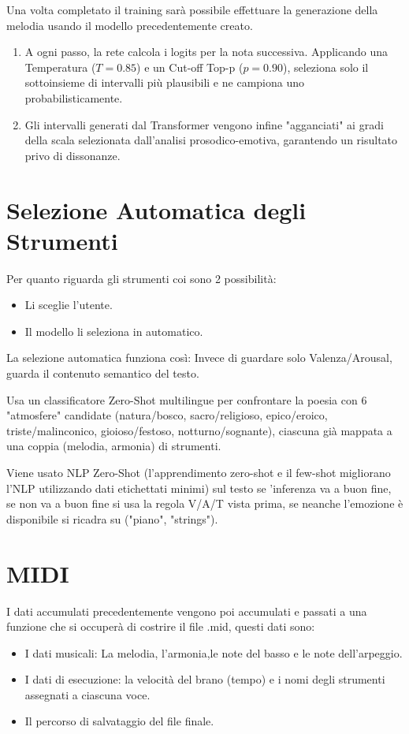 Una volta completato il training sarà possibile effettuare la generazione della melodia usando il modello precedentemente creato.
\begin{enumerate}
    \item A ogni passo, la rete calcola i logits per la nota successiva. Applicando una Temperatura ($T = 0.85$) e un Cut-off Top-p ($p = 0.90$), seleziona solo il sottoinsieme di intervalli più plausibili e ne campiona uno probabilisticamente.
    \item Gli intervalli generati dal Transformer vengono infine "agganciati" ai gradi della scala selezionata dall'analisi prosodico-emotiva, garantendo un risultato privo di dissonanze.
\end{enumerate}

\section{Selezione Automatica degli Strumenti}
Per quanto riguarda gli strumenti coi sono 2 possibilità:
\begin{itemize}
    \item Li sceglie l'utente.
    \item Il modello li seleziona in automatico.
\end{itemize}
La selezione automatica funziona così: Invece di guardare solo Valenza/Arousal, guarda il contenuto semantico del testo.

Usa un classificatore Zero-Shot multilingue per confrontare la poesia con 6 "atmosfere" candidate (natura/bosco, sacro/religioso, epico/eroico, triste/malinconico, gioioso/festoso, notturno/sognante), ciascuna già mappata a una coppia (melodia, armonia) di strumenti.

Viene usato NLP Zero-Shot (l'apprendimento zero-shot e il few-shot migliorano l'NLP utilizzando dati etichettati minimi) sul testo se 'inferenza va a buon fine, se non va a buon fine si usa la regola V/A/T vista prima, se neanche l'emozione è disponibile si ricadra su ("piano", "strings").

\section{MIDI}

I dati accumulati precedentemente vengono poi accumulati e passati a una funzione che si occuperà di costrire il file .mid, questi dati sono:
\begin{itemize}
    \item I dati musicali: La melodia, l'armonia,le note del basso e le note dell'arpeggio.
    \item I dati di esecuzione: la velocità del brano (tempo) e i nomi degli strumenti assegnati a ciascuna voce.
    \item Il percorso di salvataggio del file finale.
\end{itemize}

